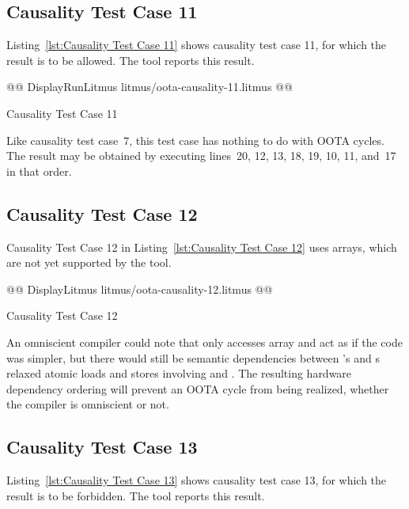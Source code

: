 \documentclass[10]{article}
\begin{document}
\subsection{Causality Test Case 11}
\label{app:Causality Test Case 11}

Listing~\ref{lst:Causality Test Case 11}
shows causality test case 11, for which the 
result is to be allowed.
The  tool reports this result.

\begin{listing}[tbp]
@@ DisplayRunLitmus litmus/oota-causality-11.litmus @@
\caption{Causality Test Case 11}
\label{lst:Causality Test Case 11}
\end{listing}

Like causality test case~7, this test case has nothing to do with OOTA cycles.
The result may be obtained by executing lines~20, 12, 13, 18, 19, 10, 11,
and~17 in that order.

\subsection{Causality Test Case 12}
\label{app:Causality Test Case 12}

Causality Test Case 12 in
Listing~\ref{lst:Causality Test Case 12}
uses arrays, which are not yet supported by the  tool.

\begin{listing}[tbp]
@@ DisplayLitmus litmus/oota-causality-12.litmus @@
\caption{Causality Test Case 12}
\label{lst:Causality Test Case 12}
\end{listing}

An omniscient compiler could note that only  accesses
array  and act as if the code was simpler, but there would
still be semantic dependencies between 's and s
relaxed atomic loads and stores involving  and .
The resulting hardware dependency ordering will prevent an OOTA cycle
from being realized, whether the compiler is omniscient or not.

\subsection{Causality Test Case 13}
\label{app:Causality Test Case 13}

Listing~\ref{lst:Causality Test Case 13}
shows causality test case 13, for which the 
result is to be forbidden.
The  tool reports this result.
\end{document}
